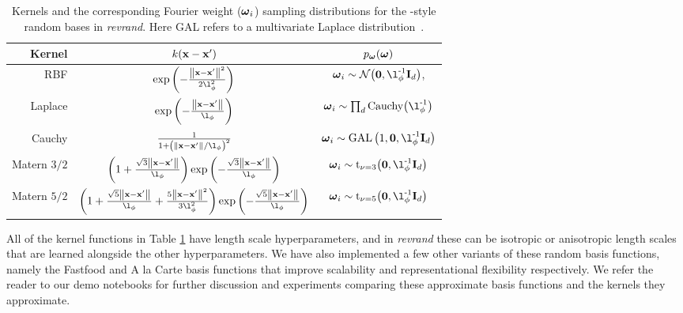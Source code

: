 \documentclass[11pt, oneside]{article}
\begin{document}
\begin{table}[htb]

    \centering

    \caption{Kernels and the corresponding Fourier weight ($\boldsymbol{\omega}_i$)
        sampling distributions for the \citet{rahimi2007}-style random bases in
        \emph{revrand}. Here GAL refers to a multivariate Laplace
        distribution~\cite{kozubowski2013multivariate}.}

    \begin{tabular}{r|c c}
        \textbf{Kernel} & $k\!\left({\mathbf{x} - \mathbf{x}'}\right)$
        & $p_{\boldsymbol{\omega}}(\boldsymbol{\omega})$ \\
        \hline
        RBF &
        $\exp\brac{-\frac{\lnorm{}{\inss - \inssprime}^2}{2\lenscale^2}}$ &
            $\ffourier_i \sim \gaus{\mathbf{0}, \lenscale\inv\ident{d}}$, \\
        Laplace & $\exp\brac{-\frac{\lnorm{}{\inss-\inssprime}}{\lenscale}}$ &
            $\ffourier_i \sim \prod_d \text{Cauchy}\!\brac{\lenscale\inv}$ \\
        Cauchy &
            $\frac{1}{1+\brac{\lnorm{}{\inss-\inssprime}/\lenscale}^2}$ & 
            $\ffourier_i \sim \text{GAL}\brac{1, \mathbf{0},
                \lenscale\inv\ident{d}}$ \\
        Matern $3/2$ & 
            $\brac{1 + \frac{\sqrt{3}\lnorm{}{\inss-\inssprime}}{\lenscale}}
            \exp\brac{-\frac{\sqrt{3}\lnorm{}{\inss-\inssprime}}{\lenscale}}$ & 
            $\ffourier_i \sim 
            \text{t}_{\nu=3}\!\brac{\mathbf{0}, \lenscale\inv\ident{d}}$ \\
        Matern $5/2$ &
            $\brac{1 + \frac{\sqrt{5}\lnorm{}{\inss-\inssprime}}{\lenscale} + 
                \frac{5\lnorm{}{\inss - \inssprime}^2}{3\lenscale^2}}
            \exp\brac{-\frac{\sqrt{5}\lnorm{}{\inss-\inssprime}}{\lenscale}}$ & 
            $\ffourier_i \sim 
            \text{t}_{\nu=5}\!\brac{\mathbf{0}, \lenscale\inv\ident{d}}$ \\
        \hline
    \end{tabular}

    \label{tab:randommappings}

\end{table}

All of the kernel functions in Table \ref{tab:randommappings} have length scale
hyperparameters, and in \emph{revrand} these can be isotropic or anisotropic
length scales that are learned alongside the other hyperparameters. We have
also implemented a few other variants of these random basis functions, namely
the Fastfood \citep{le2013fastfood} and A la Carte \citep{yang2014} basis
functions that improve scalability and representational flexibility
respectively. We refer the reader to our demo notebooks for further discussion
and experiments comparing these approximate basis functions and the kernels
they approximate.
\end{document}
